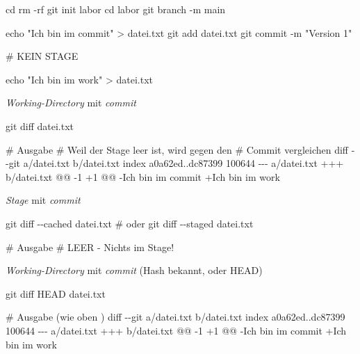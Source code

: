\documentclass[
  ngerman,
  letterpaper,
  DIV=11]{scrreprt}
\newenvironment{Shaded}{\begin{snugshade}}{\end{snugshade}}
\newcommand{\AttributeTok}[1]{\textcolor[rgb]{0.40,0.45,0.13}{#1}}
\newcommand{\BuiltInTok}[1]{\textcolor[rgb]{0.00,0.23,0.31}{#1}}
\newcommand{\CommentTok}[1]{\textcolor[rgb]{0.37,0.37,0.37}{#1}}
\newcommand{\ExtensionTok}[1]{\textcolor[rgb]{0.00,0.23,0.31}{#1}}
\newcommand{\FunctionTok}[1]{\textcolor[rgb]{0.28,0.35,0.67}{#1}}
\newcommand{\NormalTok}[1]{\textcolor[rgb]{0.00,0.23,0.31}{#1}}
\newcommand{\OperatorTok}[1]{\textcolor[rgb]{0.37,0.37,0.37}{#1}}
\newcommand{\StringTok}[1]{\textcolor[rgb]{0.13,0.47,0.30}{#1}}
\newcommand{\stage}{\textit{Stage}\xspace}
\newcommand{\work}{\textit{Working-Directory}\xspace}
\begin{document}
\begin{Shaded}
\begin{Highlighting}[]
\BuiltInTok{cd} 
\FunctionTok{rm} \AttributeTok{{-}rf} 
\FunctionTok{git}\NormalTok{ init labor}
\BuiltInTok{cd}\NormalTok{ labor }
\FunctionTok{git}\NormalTok{ branch }\AttributeTok{{-}m}\NormalTok{ main }

\BuiltInTok{echo} \StringTok{"Ich bin im commit"} \OperatorTok{\textgreater{}}\NormalTok{ datei.txt }
\FunctionTok{git}\NormalTok{ add datei.txt }
\FunctionTok{git}\NormalTok{ commit }\AttributeTok{{-}m} \StringTok{"Version 1"}

\CommentTok{\# KEIN STAGE }

\BuiltInTok{echo} \StringTok{"Ich bin im work"} \OperatorTok{\textgreater{}}\NormalTok{ datei.txt }
\end{Highlighting}
\end{Shaded}

\work mit \emph{commit}

\begin{Shaded}
\begin{Highlighting}[]
\FunctionTok{git}\NormalTok{ diff datei.txt}

\CommentTok{\# Ausgabe}
\CommentTok{\# Weil der Stage leer ist, wird gegen den }
\CommentTok{\# Commit vergleichen}
\FunctionTok{diff} \AttributeTok{{-}{-}git}\NormalTok{ a/datei.txt b/datei.txt}
\ExtensionTok{index}\NormalTok{ a0a62ed..dc87399 100644}
\ExtensionTok{{-}{-}{-}}\NormalTok{ a/datei.txt}
\ExtensionTok{+++}\NormalTok{ b/datei.txt}
\ExtensionTok{@@} \AttributeTok{{-}1}\NormalTok{ +1 @@}
\ExtensionTok{{-}Ich}\NormalTok{ bin im  commit}
\ExtensionTok{+Ich}\NormalTok{ bin im work}
\end{Highlighting}
\end{Shaded}

\stage mit \emph{commit}

\begin{Shaded}
\begin{Highlighting}[]
\FunctionTok{git}\NormalTok{ diff }\AttributeTok{{-}{-}cached}\NormalTok{ datei.txt}
\CommentTok{\# oder git diff {-}{-}staged datei.txt }

\CommentTok{\# Ausgabe}
\CommentTok{\# LEER {-} Nichts im Stage!}
\end{Highlighting}
\end{Shaded}

\work mit \emph{commit} (Hash bekannt, oder HEAD)

\begin{Shaded}
\begin{Highlighting}[]
\FunctionTok{git}\NormalTok{ diff HEAD datei.txt}

\CommentTok{\# Ausgabe (wie oben )}
\FunctionTok{diff} \AttributeTok{{-}{-}git}\NormalTok{ a/datei.txt b/datei.txt}
\ExtensionTok{index}\NormalTok{ a0a62ed..dc87399 100644}
\ExtensionTok{{-}{-}{-}}\NormalTok{ a/datei.txt}
\ExtensionTok{+++}\NormalTok{ b/datei.txt}
\ExtensionTok{@@} \AttributeTok{{-}1}\NormalTok{ +1 @@}
\ExtensionTok{{-}Ich}\NormalTok{ bin im commit}
\ExtensionTok{+Ich}\NormalTok{ bin im work}
\end{Highlighting}
\end{Shaded}
\end{document}
